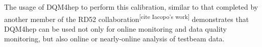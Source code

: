 The usage of DQM4hep to perform this calibration, similar to that completed by another member of the RD52 collaboration\textsuperscript{[cite Iacopo's work]} demonstrates that DQM4hep can be used not only for online monitoring and data quality monitoring, but also online or nearly-online analysis of testbeam data.

%
%
%
%
%

